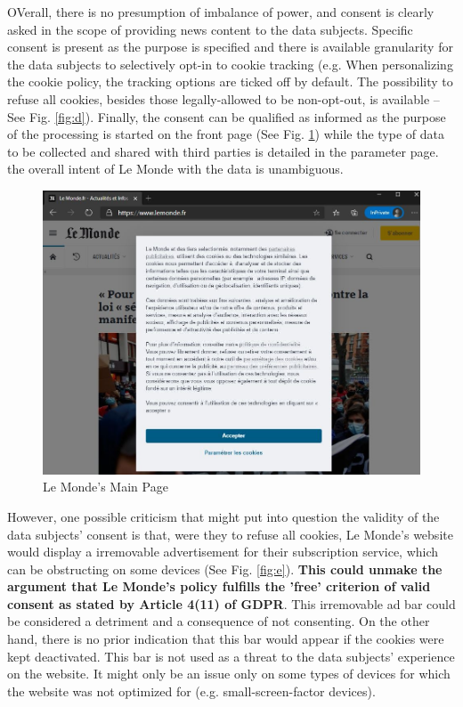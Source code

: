 \documentclass[twocolumn, letterpaper]{scrartcl}
\begin{document}
    	OVerall, there is no presumption of imbalance of power, and consent is clearly asked in the scope of providing news content to the data subjects. Specific consent is present as the purpose is specified and there is available granularity for the data subjects to selectively opt-in to cookie tracking (e.g. When personalizing the cookie policy, the tracking options are ticked off by default. The possibility to refuse all cookies, besides those legally-allowed to be non-opt-out, is available -- See Fig. \ref{fig:d}). Finally, the consent can be qualified as informed as the purpose of the processing is started on the front page (See Fig. \ref{fig:c}) while the type of data to be collected and shared with third parties is detailed in the parameter page. the overall intent of Le Monde with the data is unambiguous.
    	
    	\begin{figure}[tbp]	
            \includegraphics[width=0.9\linewidth]{lm_website.JPG}
            \caption{Le Monde's Main Page \label{fig:c}}
        \end{figure}
        
    	However, one possible criticism that might put into question the validity of the data subjects' consent is that, were they to refuse all cookies, Le Monde's website would display a irremovable advertisement for their subscription service, which can be obstructing on some devices (See Fig. \ref{fig:e}). \textbf{This could unmake the argument that Le Monde's policy fulfills the 'free' criterion of valid consent as stated by Article 4(11) of GDPR}. This irremovable ad bar could be considered a detriment and a consequence of not consenting. On the other hand, there is no prior indication that this bar would appear if the cookies were kept deactivated. This bar is not used as a threat to the data subjects' experience on the website. It might only be an issue only on some types of devices for which the website was not optimized for (e.g. small-screen-factor devices). 
    	
\end{document}
